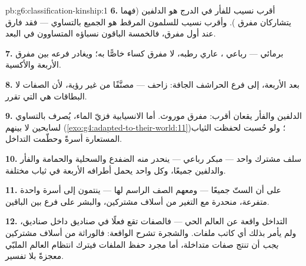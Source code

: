 \begin{solution}{pb:g6:classification-kinship:1}
\textbf{6.} أقرب نسيب للفأر في الدرج هو الدلفين (فهما يتشاركان
مفرق  ). وأقرب نسيب للسلمون المرقط هو الجميع بالتساوي
--- فقد فارق عند أول مفرق، فالخمسة الباقون نسباؤه المتساوون في
البعد.

\textbf{7.} برمائي --- رباعي ، عاري  رطبه، لا مفرق
كساء خاصًّا به؛ ويغادر فرعه بين مفرق  الأربعة والأكسية.

\textbf{8.} بعد   الأربعة، إلى فرع الحراشف
الجافة: زاحف --- مصنَّفًا من غير رؤية، لأن الصفات لا البطاقات هي
التي تقرر.

\textbf{9.} الدلفين والفأر يقعان أقرب:   مفرق
موروث. أما الانسيابية فزيّ الماء، يُصرف بالتساوي لسابحين لا 
بينهم (\cref{exo:g4:adapted-to-their-world:11})؛ ولو حُسبت لحفظت
الثياب المستعارة أسرةً وحطّمت التداخل.

\textbf{10.}  سلف مشترك واحد ---  مبكر رباعي  ---
ينحدر منه الضفدع والسحلية والحمامة والفأر والدلفين جميعًا، وكل
واحد يحمل أطرافه الأربعة في ثياب مختلفة.

\textbf{11.} على أن الستّ جميعًا --- ومعهم الصف الراسم لها ---
ينتمون إلى أسرة واحدة متفرعة، منحدرة مع التغير من أسلاف مشتركين،
والبشر على فرع   بين الباقين.

\textbf{12.} التداخل واقعة عن العالم الحي --- فالصفات تقع فعلًا
في صناديق داخل صناديق، ولم يأمر بذلك أي كاتب ملفات. والشجرة تشرح
الواقعة: فالوراثة من أسلاف مشتركين \emph{يجب} أن تنتج صفات
متداخلة، أما مجرد حفظ الملفات فيترك انتظام العالم الملبّي معجزةً
بلا تفسير.
\end{solution}

